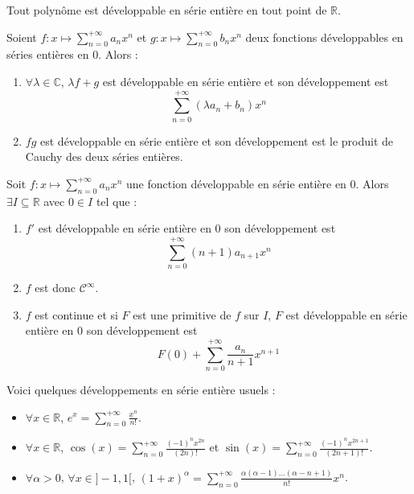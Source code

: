 
  \begin{example}
    Tout polynôme est développable en série entière en tout point de $\mathbb{R}$.
  \end{example}

  \begin{proposition}
    Soient $f : x \mapsto \sum_{n=0}^{+\infty} a_n x^n$ et $g : x \mapsto \sum_{n=0}^{+\infty} b_n x^n$ deux fonctions développables en séries entières en $0$. Alors :
    \begin{enumerate}[label=(\roman*)]
      \item $\forall \lambda \in \mathbb{C}$, $\lambda f + g$ est développable en série entière et son développement est
      \[ \sum_{n=0}^{+\infty} (\lambda a_n + b_n) x^n \]
      \item $fg$ est développable en série entière et son développement est le produit de Cauchy des deux séries entières.
    \end{enumerate}
  \end{proposition}

  \begin{proposition}
    Soit $f : x \mapsto \sum_{n=0}^{+\infty} a_n x^n$ une fonction développable en série entière en $0$. Alors $\exists I \subseteq \mathbb{R}$ avec $0 \in I$ tel que :
    \begin{enumerate}[label=(\roman*)]
      \item $f'$ est développable en série entière en $0$ son développement est
      \[ \sum_{n=0}^{+\infty} (n+1) a_{n+1} x^n \]
      \item $f$ est donc $\mathcal{C}^\infty$.
      \item $f$ est continue et si $F$ est une primitive de $f$ sur $I$, $F$ est développable en série entière en $0$ son développement est
      \[ F(0) + \sum_{n=0}^{+\infty} \frac{a_n}{n+1} x^{n+1} \]
    \end{enumerate}
  \end{proposition}

  \begin{example}
    Voici quelques développements en série entière usuels :
    \begin{itemize}
      \item $\forall x \in \mathbb{R}$, $e^x = \sum_{n=0}^{+\infty} \frac{x^n}{n!}$.
      \item $\forall x \in \mathbb{R}$, $\cos(x) = \sum_{n=0}^{+\infty} \frac{(-1)^n x^{2n}}{(2n)!}$ et $\sin(x) = \sum_{n=0}^{+\infty} \frac{(-1)^n x^{2n+1}}{(2n+1)!}$.
      \item $\forall \alpha > 0$, $\forall x \in ]-1,1[$, $(1 + x)^\alpha = \sum_{n=0}^{+\infty} \frac{\alpha(\alpha - 1) \dots (\alpha - n + 1)}{n!} x^n$.
    \end{itemize}
  \end{example}

